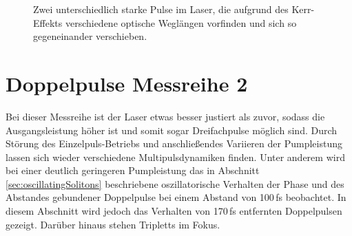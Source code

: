 \documentclass[bachelor,       %
               twoside,        %
               BCOR10mm,       %
               liststotoc,nomtotoc,bibtotoc, %
               english,ngerman, %
               final,          %
               ]{GAUBM}
\begin{document}
\begin{figure}[!htb]
   \centering   
   \hfill
   \caption{Zwei unterschiedlich starke Pulse im Laser, die aufgrund des Kerr-Effekts verschiedene optische Weglängen vorfinden und sich so gegeneinander verschieben.}
   \label{fig:running441}
 \end{figure}


\section{Doppelpulse Messreihe 2}
Bei dieser Messreihe ist der Laser etwas besser justiert als zuvor, sodass die Ausgangsleistung höher ist und somit sogar Dreifachpulse möglich sind.
Durch Störung des Einzelpuls-Betriebs und anschließendes Variieren der Pumpleistung lassen sich wieder verschiedene Multipulsdynamiken finden.
Unter anderem wird bei einer deutlich geringeren Pumpleistung das in Abschnitt \ref{sec:oscillatingSolitons} beschriebene oszillatorische Verhalten der Phase und des Abstandes gebundener Doppelpulse bei einem Abstand von 100\,fs beobachtet.
In diesem Abschnitt wird jedoch das Verhalten von 170\,fs entfernten Doppelpulsen gezeigt.
Darüber hinaus stehen Tripletts im Fokus.
\end{document}
